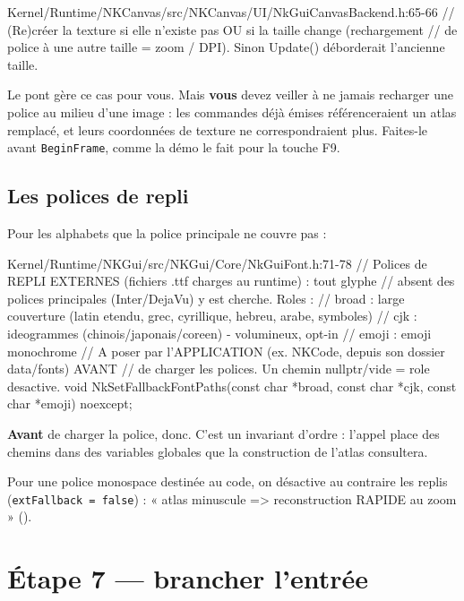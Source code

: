 \begin{nkpiege}
\begin{nkcode}{Kernel/Runtime/NKCanvas/src/NKCanvas/UI/NkGuiCanvasBackend.h:65-66}
// (Re)créer la texture si elle n'existe pas OU si la taille change (rechargement
// de police à une autre taille = zoom / DPI). Sinon Update() déborderait l'ancienne taille.
\end{nkcode}
Le pont gère ce cas pour vous. Mais \textbf{vous} devez veiller à ne jamais
recharger une police au milieu d'une image : les commandes déjà émises
référenceraient un atlas remplacé, et leurs coordonnées de texture ne
correspondraient plus. Faites-le avant \texttt{BeginFrame}, comme la démo le fait
pour la touche F9.
\end{nkpiege}

\subsection{Les polices de repli}

Pour les alphabets que la police principale ne couvre pas :

\begin{nkcode}{Kernel/Runtime/NKGui/src/NKGui/Core/NkGuiFont.h:71-78}
// Polices de REPLI EXTERNES (fichiers .ttf charges au runtime) : tout glyphe
// absent des polices principales (Inter/DejaVu) y est cherche. Roles :
//   broad : large couverture (latin etendu, grec, cyrillique, hebreu, arabe, symboles)
//   cjk   : ideogrammes (chinois/japonais/coreen) - volumineux, opt-in
//   emoji : emoji monochrome
// A poser par l'APPLICATION (ex. NKCode, depuis son dossier data/fonts) AVANT
// de charger les polices. Un chemin nullptr/vide = role desactive.
void NkSetFallbackFontPaths(const char *broad, const char *cjk, const char *emoji) noexcept;
\end{nkcode}

\textbf{Avant} de charger la police, donc. C'est un invariant d'ordre : l'appel
place des chemins dans des variables globales que la construction de l'atlas
consultera.

Pour une police monospace destinée au code, on désactive au contraire les replis
(\texttt{extFallback = false}) : « atlas minuscule => reconstruction RAPIDE au
zoom » ().

\section{Étape 7 — brancher l'entrée}

